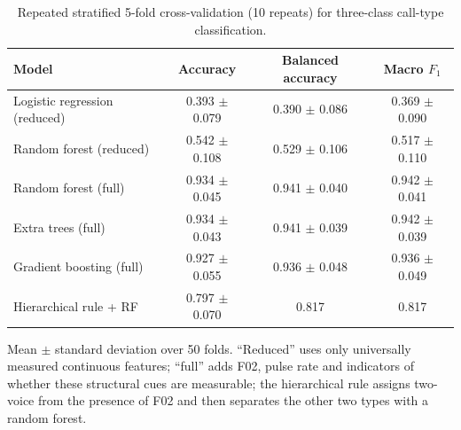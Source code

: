 \begin{table}[!ht]
\centering
\caption{Repeated stratified 5-fold cross-validation (10 repeats) for three-class call-type classification.}
\label{tab:p1clf}
\footnotesize
\begin{tabular}{lccc}
\toprule
Model & Accuracy & Balanced accuracy & Macro $F_1$ \\
\midrule
Logistic regression (reduced) & 0.393 $\pm$ 0.079 & 0.390 $\pm$ 0.086 & 0.369 $\pm$ 0.090 \\
Random forest (reduced) & 0.542 $\pm$ 0.108 & 0.529 $\pm$ 0.106 & 0.517 $\pm$ 0.110 \\
Random forest (full) & 0.934 $\pm$ 0.045 & 0.941 $\pm$ 0.040 & 0.942 $\pm$ 0.041 \\
Extra trees (full) & 0.934 $\pm$ 0.043 & 0.941 $\pm$ 0.039 & 0.942 $\pm$ 0.039 \\
Gradient boosting (full) & 0.927 $\pm$ 0.055 & 0.936 $\pm$ 0.048 & 0.936 $\pm$ 0.049 \\
Hierarchical rule + RF & 0.797 $\pm$ 0.070 & 0.817 & 0.817 \\
\bottomrule
\end{tabular}
\par\vspace{2pt}\footnotesize Mean $\pm$ standard deviation over 50 folds. ``Reduced'' uses only universally measured continuous features; ``full'' adds F02, pulse rate and indicators of whether these structural cues are measurable; the hierarchical rule assigns two-voice from the presence of F02 and then separates the other two types with a random forest.
\end{table}